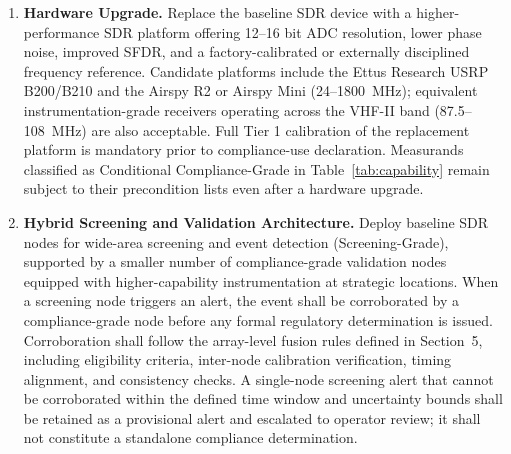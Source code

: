 \documentclass[11pt]{article}
\begin{document}
\begin{enumerate}

\item \textbf{Hardware Upgrade.} Replace the baseline SDR device with a higher-performance SDR platform offering 12--16 bit ADC resolution, lower phase noise, improved SFDR, and a factory-calibrated or externally disciplined frequency reference. Candidate platforms include the Ettus Research USRP B200/B210 and the Airspy R2 or Airspy Mini (24--1800~MHz); equivalent instrumentation-grade receivers operating across the VHF-II band (87.5--108~MHz) are also acceptable. Full Tier 1 calibration of the replacement platform is mandatory prior to compliance-use declaration. Measurands classified as Conditional Compliance-Grade in Table~\ref{tab:capability} remain subject to their precondition lists even after a hardware upgrade.

\item \textbf{Hybrid Screening and Validation Architecture.} Deploy baseline SDR nodes for wide-area screening and event detection (Screening-Grade), supported by a smaller number of compliance-grade validation nodes equipped with higher-capability instrumentation at strategic locations. When a screening node triggers an alert, the event shall be corroborated by a compliance-grade node before any formal regulatory determination is issued. Corroboration shall follow the array-level fusion rules defined in Section~5, including eligibility criteria, inter-node calibration verification, timing alignment, and consistency checks. A single-node screening alert that cannot be corroborated within the defined time window and uncertainty bounds shall be retained as a provisional alert and escalated to operator review; it shall not constitute a standalone compliance determination.


\end{enumerate}
\end{document}
